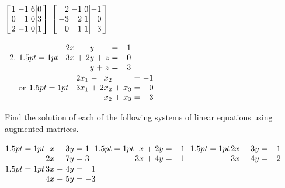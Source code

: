 \begin{multicols}{2}
\begin{ex}
\begin{exenumerate}
\exitem $\leftB \begin{array}{rrr|r}
	1 & -1 & 6 & 0 \\
	0 &  1 & 0 & 3 \\
	2 & -1 & 0 & 1
\end{array} \rightB$
\exitem $\leftB \begin{array}{rrr|r}
 2 & -1 & 0 & -1 \\
-3 &  2 & 1 & 0 \\
 0 &  1 & 1 & 3
\end{array} \rightB$
\end{exenumerate}
\begin{sol}
\begin{enumerate}[label={\alph*.}]
\setcounter{enumi}{1}
\item  $ \arraycolsep=1pt \begin{array}{rlrlrcr}
		 2x & - &  y &   &   & = & -1 \\
		-3x & + & 2y & + & z & = & 0 \\
		    &   &  y & + & z & = & 3
	\end{array}$ \\
	or \quad $ \arraycolsep=1pt\begin{array}{rlrlrcr}
			 2x_1 & - &  x_2 &   &     & = & -1 \\
			-3x_1 & + & 2x_2 & + & x_3 & = & 0 \\
			      &   &  x_2 & + & x_3 & = & 3
	\end{array}$
\end{enumerate}
\end{sol}
\end{ex}

\begin{ex}
Find the solution of each of the following systems of linear equations using augmented matrices.

\begin{exenumerate}
\exitem
$\arraycolsep=1pt
\begin{array}[t]{rlrcr}
  	 x & - & 3y & = & 1 \\
	2x & - & 7y & = & 3
\end{array}$
\exitem 
$\arraycolsep=1pt
\begin{array}[t]{rlrcr}
	 x & + & 2y &=& 1 \\
	3x & + & 4y &=& -1
\end{array}$
\exitem 
$\arraycolsep=1pt
\begin{array}[t]{rlrcr}
	2x & + & 3y &=& -1 \\
	3x & + & 4y &=& 2
\end{array}$
\exitem 
$\arraycolsep=1pt
\begin{array}[t]{rlrcr}
	3x & + & 4y &=& 1 \\
	4x & + & 5y &=& -3
\end{array}$
\end{exenumerate}


\end{ex}
\end{multicols}
